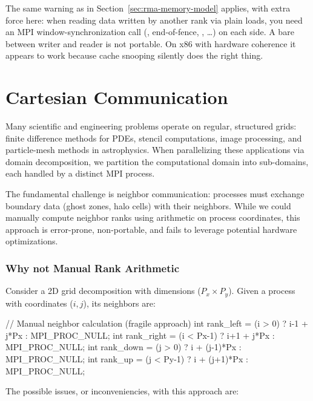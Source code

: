 \begin{warningblock}
    The same warning as in Section~\ref{sec:rma-memory-model} applies, with extra force here: when reading data written by another rank via plain loads, you need an MPI window-synchronization call (, end-of-fence, , \dots) on each side. A bare  between writer and reader is not portable. On x86 with hardware coherence it appears to work because cache snooping silently does the right thing.
\end{warningblock}

\section{Cartesian Communication}

Many scientific and engineering problems operate on regular, structured grids: finite difference methods for PDEs, stencil computations, image processing, and particle-mesh methods in astrophysics. When parallelizing these applications via domain decomposition, we partition the computational domain into sub-domains, each handled by a distinct MPI process.

The fundamental challenge is neighbor communication: processes must exchange boundary data (ghost zones, halo cells) with their neighbors. While we could manually compute neighbor ranks using arithmetic on process coordinates, this approach is error-prone, non-portable, and fails to leverage potential hardware optimizations.

\subsubsection{Why not Manual Rank Arithmetic}

Consider a 2D grid decomposition with dimensions ($P_x \times P_y$). Given a process with coordinates ($i, j$), its neighbors are:

\begin{codeblock}[language=C]
// Manual neighbor calculation (fragile approach)
int rank_left  = (i > 0)     ? i-1 + j*Px   : MPI_PROC_NULL;
int rank_right = (i < Px-1)  ? i+1 + j*Px   : MPI_PROC_NULL;
int rank_down  = (j > 0)     ? i + (j-1)*Px : MPI_PROC_NULL;
int rank_up    = (j < Py-1)  ? i + (j+1)*Px : MPI_PROC_NULL;
\end{codeblock}

The possible issues, or inconveniencies, with this approach are:

